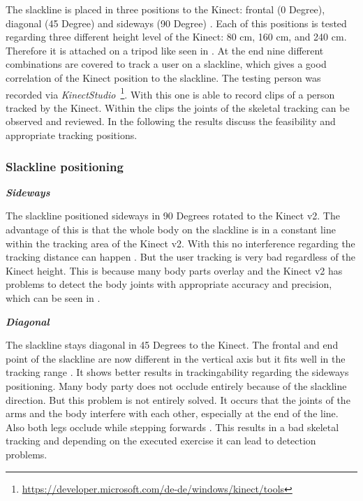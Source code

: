 The slackline is placed in three positions to the Kinect: frontal (0 Degree), diagonal (45 Degree) and sideways (90 Degree) \textbf{}. Each of this positions is tested regarding three different height level of the Kinect: 80 cm, 160 cm, and 240 cm. Therefore it is attached on a tripod like seen in \textbf{}. At the end nine different combinations are covered to track a user on a slackline, which gives a good correlation of the Kinect position to the slackline. The testing person was recorded via \textit{KinectStudio}~\footnote{\url{https://developer.microsoft.com/de-de/windows/kinect/tools}}. With this one is able to record clips of a person tracked by the Kinect. Within the clips the joints of the skeletal tracking can be observed and reviewed. In the following the results discuss the feasibility and appropriate tracking positions.

\subsubsection{Slackline positioning}
\textit{\textbf{Sideways}}

The slackline positioned sideways in 90 Degrees rotated to the Kinect v2. The advantage of this is that the whole body on the slackline is in a constant line within the tracking area of the Kinect v2. With this no interference regarding the tracking distance can happen \textbf{}. But the user tracking is very bad regardless of the Kinect height. This is because many body parts overlay and the Kinect v2 has problems to detect the body joints with appropriate accuracy and precision, which can be seen in \textbf{}.

\textit{\textbf{Diagonal}}

The slackline stays diagonal in 45 Degrees to the Kinect. The frontal and end point of the slackline are now different in the vertical axis but it fits well in the tracking range \textbf{}. 
It shows better results in trackingability regarding the sideways positioning. Many body party does not occlude entirely because of the slackline direction. But this problem is not entirely solved. It occurs that the joints of the arms and the body interfere with each other, especially at the end of the line. Also both legs occlude while stepping forwards \textbf{}. This results in a bad skeletal tracking and depending on the executed exercise it can lead to detection problems.

